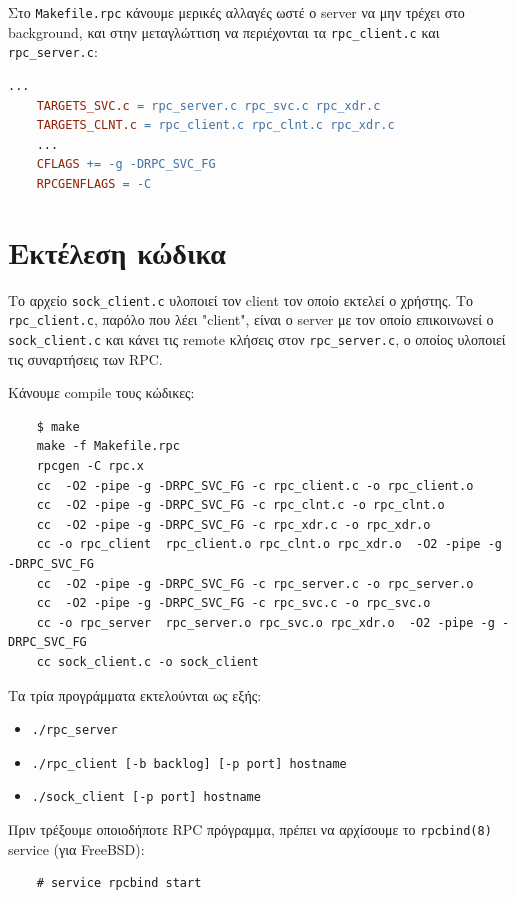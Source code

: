 \documentclass{article}
\begin{document}
Στο \lstinline{Makefile.rpc} κάνουμε μερικές αλλαγές ωστέ ο server να μην
τρέχει στο background, και στην μεταγλώττιση να περιέχονται τα
\lstinline{rpc_client.c} και \lstinline{rpc_server.c}:

\begin{lstlisting}[language=make]
	...
	TARGETS_SVC.c = rpc_server.c rpc_svc.c rpc_xdr.c
	TARGETS_CLNT.c = rpc_client.c rpc_clnt.c rpc_xdr.c
	...
	CFLAGS += -g -DRPC_SVC_FG
	RPCGENFLAGS = -C
\end{lstlisting}

\section{Εκτέλεση κώδικα}

Το αρχείο \lstinline{sock_client.c} υλοποιεί τον client τον οποίο εκτελεί ο
χρήστης. Το \lstinline{rpc_client.c}, παρόλο που λέει "client", είναι ο server
με τον οποίο επικοινωνεί ο \lstinline{sock_client.c} και κάνει τις remote
κλήσεις στον \lstinline{rpc_server.c}, ο οποίος υλοποιεί τις συναρτήσεις των
RPC.

Κάνουμε compile τους κώδικες:

\begin{lstlisting}
	$ make
	make -f Makefile.rpc
	rpcgen -C rpc.x
	cc  -O2 -pipe -g -DRPC_SVC_FG -c rpc_client.c -o rpc_client.o
	cc  -O2 -pipe -g -DRPC_SVC_FG -c rpc_clnt.c -o rpc_clnt.o
	cc  -O2 -pipe -g -DRPC_SVC_FG -c rpc_xdr.c -o rpc_xdr.o
	cc -o rpc_client  rpc_client.o rpc_clnt.o rpc_xdr.o  -O2 -pipe -g -DRPC_SVC_FG
	cc  -O2 -pipe -g -DRPC_SVC_FG -c rpc_server.c -o rpc_server.o
	cc  -O2 -pipe -g -DRPC_SVC_FG -c rpc_svc.c -o rpc_svc.o
	cc -o rpc_server  rpc_server.o rpc_svc.o rpc_xdr.o  -O2 -pipe -g -DRPC_SVC_FG
	cc sock_client.c -o sock_client
\end{lstlisting}

Τα τρία προγράμματα εκτελούνται ως εξής:
\begin{itemize}
	\item \lstinline{./rpc_server}
	\item \lstinline{./rpc_client [-b backlog] [-p port] hostname}
	\item \lstinline{./sock_client [-p port] hostname}
\end{itemize}

Πριν τρέξουμε οποιοδήποτε RPC πρόγραμμα, πρέπει να αρχίσουμε το
\lstinline{rpcbind(8)} service (για FreeBSD):

\begin{lstlisting}
	# service rpcbind start
\end{lstlisting}
\end{document}
